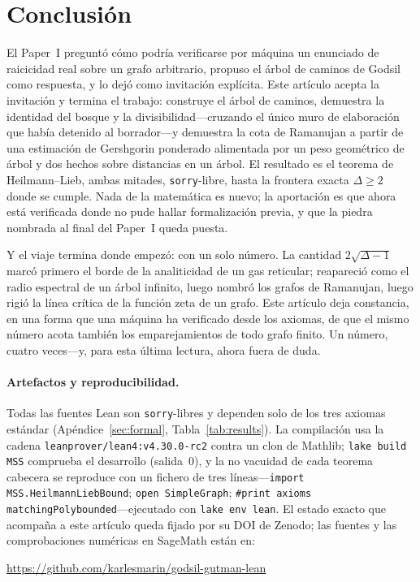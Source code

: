 \documentclass[11pt]{article}
\newcommand{\lean}[1]{{\def\_{\textunderscore\allowbreak}\texttt{#1}}}
\begin{document}
\section{Conclusi\'on}

El Paper~I pregunt\'o c\'omo podr\'ia verificarse por m\'aquina un enunciado de
raicicidad real sobre un grafo arbitrario, propuso el \'arbol de caminos de Godsil
como respuesta, y lo dej\'o como invitaci\'on expl\'icita. Este art\'iculo acepta la
invitaci\'on y termina el trabajo: construye el \'arbol de caminos, demuestra la
identidad del bosque y la divisibilidad---cruzando el \'unico muro de elaboraci\'on
que hab\'ia detenido al borrador---y demuestra la cota de Ramanujan a partir de una
estimaci\'on de Gershgorin ponderado alimentada por un peso geom\'etrico de \'arbol
y dos hechos sobre distancias en un \'arbol. El resultado es el teorema de
Heilmann--Lieb, ambas mitades, \lean{sorry}-libre, hasta la frontera exacta
$\Delta\ge2$ donde se cumple. Nada de la matem\'atica es nuevo; la aportaci\'on es
que ahora est\'a verificada donde no pude hallar formalizaci\'on previa, y que la
piedra nombrada al final del Paper~I queda puesta.

Y el viaje termina donde empez\'o: con un solo n\'umero. La cantidad
$2\sqrt{\Delta-1}$ marc\'o primero el borde de la analiticidad de un gas reticular;
reapareci\'o como el radio espectral de un \'arbol infinito, luego nombr\'o los
grafos de Ramanujan, luego rigi\'o la l\'inea cr\'itica de la funci\'on zeta de un
grafo. Este art\'iculo deja constancia, en una forma que una m\'aquina ha verificado
desde los axiomas, de que el mismo n\'umero acota tambi\'en los emparejamientos de
todo grafo finito. Un n\'umero, cuatro veces---y, para esta \'ultima lectura, ahora
fuera de duda.

\paragraph{Artefactos y reproducibilidad.} Todas las fuentes Lean son
\lean{sorry}-libres y dependen solo de los tres axiomas est\'andar
(Ap\'endice~\ref{sec:formal}, Tabla~\ref{tab:results}). La compilaci\'on usa la
cadena \lean{leanprover/lean4:v4.30.0-rc2} contra un clon de Mathlib;
\lean{lake build MSS} comprueba el desarrollo (salida~0), y la no vacuidad de cada
teorema cabecera se reproduce con un fichero de tres l\'ineas---\lean{import
MSS.HeilmannLiebBound}; \lean{open SimpleGraph}; \lean{\#print axioms
matchingPoly\_bounded}---ejecutado con \lean{lake env lean}. El estado exacto que
acompa\~na a este art\'iculo queda fijado por su DOI de Zenodo; las fuentes y las
comprobaciones num\'ericas en SageMath est\'an en:
\begin{center}
\url{https://github.com/karlesmarin/godsil-gutman-lean}
\end{center}
\end{document}
